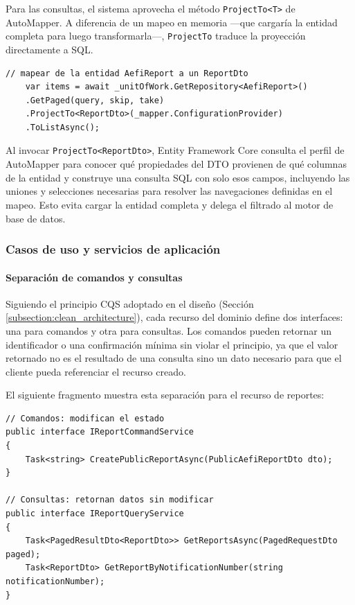 Para las consultas, el sistema aprovecha el método \texttt{ProjectTo<T>} de AutoMapper. 
A diferencia de un mapeo en memoria —que cargaría la entidad completa para luego transformarla—, \texttt{ProjectTo} traduce la proyección directamente a SQL.

\begin{lstlisting}[language={[Sharp]C}, caption={Proyección directa a DTO con ProjectTo}, label={lst:projectto}]
// mapear de la entidad AefiReport a un ReportDto
    var items = await _unitOfWork.GetRepository<AefiReport>()
    .GetPaged(query, skip, take)
    .ProjectTo<ReportDto>(_mapper.ConfigurationProvider) 
    .ToListAsync();
\end{lstlisting}

Al invocar \texttt{ProjectTo<ReportDto>}, Entity Framework Core consulta el perfil de AutoMapper para conocer qué propiedades del DTO provienen de qué columnas de la entidad y construye una consulta SQL con solo esos campos, incluyendo las uniones y selecciones necesarias para resolver las navegaciones definidas en el mapeo. Esto evita cargar la entidad completa y delega el filtrado al motor de base de datos.


\subsubsection{Casos de uso y servicios de aplicación}

\paragraph{Separación de comandos y consultas}

Siguiendo el principio CQS adoptado en el diseño (Sección \ref{subsection:clean_architecture}), cada recurso del dominio define dos interfaces: una para comandos y otra para consultas. Los comandos pueden retornar un identificador o una confirmación mínima sin violar el principio, ya que el valor retornado no es el resultado de una consulta sino un dato necesario para que el cliente pueda referenciar el recurso creado.

El siguiente fragmento muestra esta separación para el recurso de reportes:

\begin{lstlisting}[language={[Sharp]C}, caption={Separación CQS en interfaces de reportes}, label={lst:cqs}]
// Comandos: modifican el estado
public interface IReportCommandService
{
    Task<string> CreatePublicReportAsync(PublicAefiReportDto dto);
}

// Consultas: retornan datos sin modificar
public interface IReportQueryService
{
    Task<PagedResultDto<ReportDto>> GetReportsAsync(PagedRequestDto paged);
    Task<ReportDto> GetReportByNotificationNumber(string notificationNumber);
}
\end{lstlisting}

